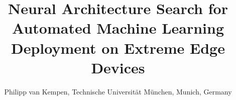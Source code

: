 \documentclass[10pt,        %
               a4paper,     %
               journal,     %
               ]{IEEEtran}
\makeatletter
\def\markboth#1#2{\def\leftmark{\@IEEEcompsoconly{\sffamily}\MakeUppercase{\protect#1}}%
\def\rightmark{\@IEEEcompsoconly{\sffamily}\MakeUppercase{\protect#2}}}
\makeatother
\begin{document}
\title{Neural Architecture Search for Automated Machine Learning Deployment on Extreme Edge Devices}
%
%

\author{Philipp van Kempen, Technische Universit\"at M\"unchen, Munich, Germany} %


% 
%

\markboth{Advanced Seminar - Real-Time Computer Systems, Winter Term 2020}%
{Philipp van Kempen: Network Architecture Search for Automated Machine Learning Deployment on Extreme Edge Devices}

% 
\end{document}
